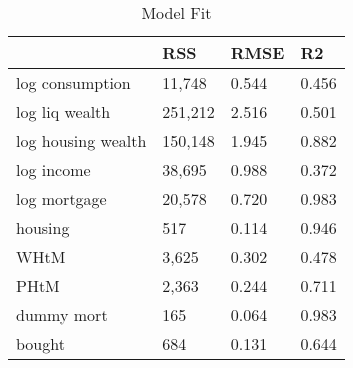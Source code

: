 \begin{table}[htbp]
\caption{\label{clabel} Model Fit}\centering\medskip
\begin{tabular}{llll} \hline \hline
 & RSS  & RMSE  & R2  \\  \hline 
log consumption &    11,748 &     0.544 &     0.456 \\  
log liq wealth &   251,212 &     2.516 &     0.501 \\  
log housing wealth &   150,148 &     1.945 &     0.882 \\  
log income &    38,695 &     0.988 &     0.372 \\  
log mortgage &    20,578 &     0.720 &     0.983 \\  
housing &       517 &     0.114 &     0.946 \\  
WHtM &     3,625 &     0.302 &     0.478 \\  
PHtM &     2,363 &     0.244 &     0.711 \\  
dummy mort &       165 &     0.064 &     0.983 \\  
bought &       684 &     0.131 &     0.644 \\  
\hline \hline \end{tabular}
\end{table}
